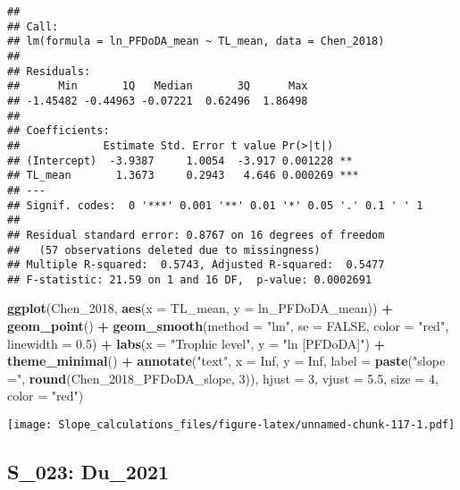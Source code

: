 \documentclass[
]{article}
\newenvironment{Shaded}{\begin{snugshade}}{\end{snugshade}}
\newcommand{\AttributeTok}[1]{\textcolor[rgb]{0.13,0.29,0.53}{#1}}
\newcommand{\ConstantTok}[1]{\textcolor[rgb]{0.56,0.35,0.01}{#1}}
\newcommand{\DecValTok}[1]{\textcolor[rgb]{0.00,0.00,0.81}{#1}}
\newcommand{\FloatTok}[1]{\textcolor[rgb]{0.00,0.00,0.81}{#1}}
\newcommand{\FunctionTok}[1]{\textcolor[rgb]{0.13,0.29,0.53}{\textbf{#1}}}
\newcommand{\NormalTok}[1]{#1}
\newcommand{\SpecialCharTok}[1]{\textcolor[rgb]{0.81,0.36,0.00}{\textbf{#1}}}
\newcommand{\StringTok}[1]{\textcolor[rgb]{0.31,0.60,0.02}{#1}}
\begin{document}
\begin{verbatim}
## 
## Call:
## lm(formula = ln_PFDoDA_mean ~ TL_mean, data = Chen_2018)
## 
## Residuals:
##      Min       1Q   Median       3Q      Max 
## -1.45482 -0.44963 -0.07221  0.62496  1.86498 
## 
## Coefficients:
##             Estimate Std. Error t value Pr(>|t|)    
## (Intercept)  -3.9387     1.0054  -3.917 0.001228 ** 
## TL_mean       1.3673     0.2943   4.646 0.000269 ***
## ---
## Signif. codes:  0 '***' 0.001 '**' 0.01 '*' 0.05 '.' 0.1 ' ' 1
## 
## Residual standard error: 0.8767 on 16 degrees of freedom
##   (57 observations deleted due to missingness)
## Multiple R-squared:  0.5743, Adjusted R-squared:  0.5477 
## F-statistic: 21.59 on 1 and 16 DF,  p-value: 0.0002691
\end{verbatim}

\begin{Shaded}
\begin{Highlighting}[]
\FunctionTok{ggplot}\NormalTok{(Chen\_2018, }\FunctionTok{aes}\NormalTok{(}\AttributeTok{x =}\NormalTok{ TL\_mean, }\AttributeTok{y =}\NormalTok{ ln\_PFDoDA\_mean)) }\SpecialCharTok{+}
  \FunctionTok{geom\_point}\NormalTok{() }\SpecialCharTok{+}
  \FunctionTok{geom\_smooth}\NormalTok{(}\AttributeTok{method =} \StringTok{"lm"}\NormalTok{, }\AttributeTok{se =} \ConstantTok{FALSE}\NormalTok{, }\AttributeTok{color =} \StringTok{"red"}\NormalTok{, }\AttributeTok{linewidth =} \FloatTok{0.5}\NormalTok{) }\SpecialCharTok{+}
  \FunctionTok{labs}\NormalTok{(}\AttributeTok{x =} \StringTok{"Trophic level"}\NormalTok{,}
       \AttributeTok{y =} \StringTok{"ln [PFDoDA]"}\NormalTok{) }\SpecialCharTok{+}
  \FunctionTok{theme\_minimal}\NormalTok{() }\SpecialCharTok{+}
  \FunctionTok{annotate}\NormalTok{(}\StringTok{"text"}\NormalTok{, }\AttributeTok{x =} \ConstantTok{Inf}\NormalTok{, }\AttributeTok{y =} \ConstantTok{Inf}\NormalTok{, }\AttributeTok{label =} \FunctionTok{paste}\NormalTok{(}\StringTok{"slope ="}\NormalTok{, }\FunctionTok{round}\NormalTok{(Chen\_2018\_PFDoDA\_slope, }\DecValTok{3}\NormalTok{)), }
           \AttributeTok{hjust =} \DecValTok{3}\NormalTok{, }\AttributeTok{vjust =} \FloatTok{5.5}\NormalTok{, }\AttributeTok{size =} \DecValTok{4}\NormalTok{, }\AttributeTok{color =} \StringTok{"red"}\NormalTok{)}
\end{Highlighting}
\end{Shaded}

\texttt{[image: Slope\_calculations\_files/figure-latex/unnamed-chunk-117-1.pdf]}

\subsection{S\_023: Du\_2021}\label{s_023-du_2021-1}
\end{document}
